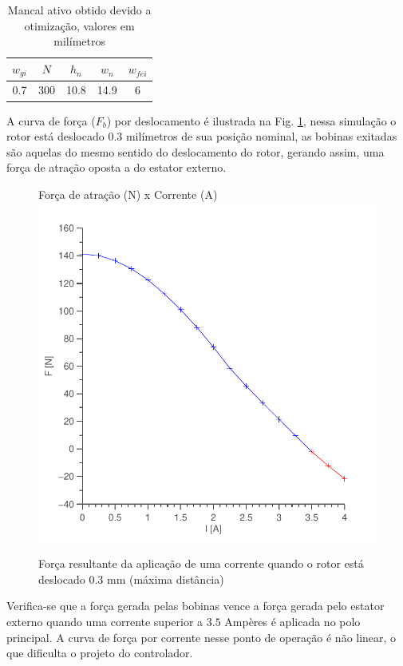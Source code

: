 \begin{table}[ht!]
	\centering
	\begin{tabular}{c c c c c}
		 $w_{gi}$ 	& $N$ & $h_n$ & $w_n$ & $w_{fei}$  \\ \hline \hline
		 0.7		& 300  	& 10.8 	& 14.9	& 6
	\end{tabular} 
	\caption{Mancal ativo obtido devido a otimização, valores em milímetros}
	\label{tab:ativo:resultado} 
\end{table}

A curva de força ($F_b$) por deslocamento é ilustrada na Fig. \ref{ativo_otimizado_fem_I_dx03}, nessa simulação o rotor está deslocado 0.3 milímetros de sua posição nominal, as bobinas exitadas são aquelas do mesmo sentido do deslocamento do rotor, gerando assim, uma força de atração oposta a do estator externo.  

\begin{figure}[ht!]
\centering
Força de atração (N) x Corrente (A)
\includegraphics[width=0.8\linewidth]{Figs/Simulacoes/Ativo/ativo_otimizado_fem_I_dx03}
\caption{Força resultante da aplicação de uma corrente quando o rotor está deslocado 0.3 mm (máxima distância)}
\label{ativo_otimizado_fem_I_dx03}
\end{figure}

Verifica-se que a força gerada pelas bobinas vence a força gerada pelo estator externo quando uma corrente superior a $3.5$ Ampères é aplicada no polo principal. A curva de força por corrente nesse ponto de operação é não linear, o que dificulta o projeto do controlador.

